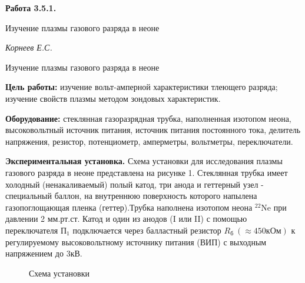 \documentclass[14pt]{article}
\begin{document}
\begin{titlepage}
	\begin{center}
		\fontsize{18pt}{20pt}\selectfont
		\textbf{Работа 3.5.1.}	
	
		\vspace{5cm}
		\fontsize{24pt}{25pt}\selectfont
		Изучение плазмы газового разряда в неоне
	\end{center}
	\begin{flushright}
		\fontsize{18pt}{20pt}\selectfont
		\vspace{14cm}
		\hspace{-3cm}
		\textit{Корнеев Е.С.}
	\end{flushright}		
\end{titlepage}

\begin{center}
	\fontsize{16pt}{18pt}\selectfont	
	Изучение плазмы газового разряда в неоне
\end{center}


\fontsize{14pt}{16pt}\selectfont
\vspace{1cm}
\textbf{Цель работы:} изучение вольт-амперной характеристики тлеющего разряда; изучение свойств плазмы методом зондовых характеристик.

\vspace{0.5cm}
\textbf{Оборудование:} стеклянная газоразрядная трубка, наполненная изотопом неона, высоковольтный источник питания, источник питания постоянного тока, делитель напряжения, резистор, потенциометр, амперметры, вольтметры, переключатели. 

\vspace{1cm}
\textbf{Экспериментальная установка.} Схема установки для исследования плазмы газового разряда в неоне представлена на рисунке 1. Стеклянная трубка имеет холодный (ненакаливаемый) полый катод, три анода и геттерный узел - специальный баллон, на внутреннюю поверхность которого напылена газопоглощающая пленка (геттер).Трубка наполнена изотопом неона $^{22}$Ne при давлении 2 мм.рт.ст. Катод и один из анодов (I или II) с помощью переключателя П$_1$ подключается через балластный резистор 
$R_\text{б}~(\approx 450 \text{кОм})$ к регулируемому высоковольтному источнику питания (ВИП) с выходным напряжением до 3кВ. 

\begin{figure}[h!]
	\caption{Схема установки}
	\label{fig:image}
\end{figure}
\end{document}
